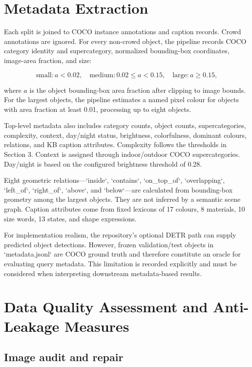 \documentclass{article}
\begin{document}
\section{Metadata Extraction}\label{metadata-extraction}

Each split is joined to COCO instance annotations and caption records.
Crowd annotations are ignored. For every non-crowd object, the pipeline
records COCO category identity and supercategory, normalized
bounding-box coordinates, image-area fraction, and size:

\[
\text{small}:a<0.02,\quad
\text{medium}:0.02\leq a<0.15,\quad
\text{large}:a\geq0.15,
\]

where \(a\) is the object bounding-box area fraction after clipping to
image bounds. For the largest objects, the pipeline estimates a named
pixel colour for objects with area fraction at least 0.01, processing up
to eight objects.

Top-level metadata also includes category counts, object counts,
supercategories, complexity, context, day/night status, brightness,
colorfulness, dominant colours, relations, and KB caption attributes.
Complexity follows the thresholds in Section 3. Context is assigned
through indoor/outdoor COCO supercategories. Day/night is based on the
configured brightness threshold of 0.28.

Eight geometric relations---`inside`, `contains`, `on\_top\_of`,
`overlapping`, `left\_of`, `right\_of`, `above`, and `below`---are
calculated from bounding-box geometry among the largest objects. They
are not inferred by a semantic scene graph. Caption attributes come from
fixed lexicons of 17 colours, 8 materials, 10 size words, 13 states, and
shape expressions.

For implementation realism, the repository's optional DETR path can
supply predicted object detections. However, frozen validation/test
objects in `metadata.jsonl` are COCO ground truth and therefore
constitute an oracle for evaluating query metadata. This limitation is
recorded explicitly and must be considered when interpreting downstream
metadata-based results.

\section{Data Quality Assessment and Anti-Leakage
Measures}\label{data-quality-assessment-and-anti-leakage-measures}

\subsection{Image audit and repair}\label{image-audit-and-repair}
\end{document}
